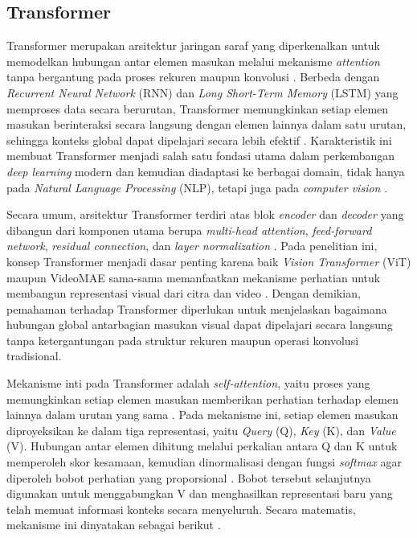 \subsection{Transformer} \label{II.Teori4}
Transformer merupakan arsitektur jaringan saraf yang diperkenalkan untuk memodelkan hubungan antar elemen masukan melalui mekanisme \textit{attention} tanpa bergantung pada proses rekuren maupun konvolusi \cite{vaswani2023attentionneed}. Berbeda dengan \textit{Recurrent Neural Network} (RNN) dan \textit{Long Short-Term Memory} (LSTM) yang memproses data secara berurutan, Transformer memungkinkan setiap elemen masukan berinteraksi secara langsung dengan elemen lainnya dalam satu urutan, sehingga konteks global dapat dipelajari secara lebih efektif \cite{vaswani2023attentionneed}. Karakteristik ini membuat Transformer menjadi salah satu fondasi utama dalam perkembangan \textit{deep learning} modern dan kemudian diadaptasi ke berbagai domain, tidak hanya pada \textit{Natural Language Processing} (NLP), tetapi juga pada \textit{computer vision} \cite{vaswani2023attentionneed}. \par

Secara umum, arsitektur Transformer terdiri atas blok \textit{encoder} dan \textit{decoder} yang dibangun dari komponen utama berupa \textit{multi-head attention}, \textit{feed-forward network}, \textit{residual connection}, dan \textit{layer normalization} \cite{vaswani2023attentionneed}. Pada penelitian ini, konsep Transformer menjadi dasar penting karena baik \textit{Vision Transformer} (ViT) maupun VideoMAE sama-sama memanfaatkan mekanisme perhatian untuk membangun representasi visual dari citra dan video \cite{dosovitskiy2021imageworth16x16words}\cite{tong2022videomaemaskedautoencodersdataefficient}\cite{vaswani2023attentionneed}. Dengan demikian, pemahaman terhadap Transformer diperlukan untuk menjelaskan bagaimana hubungan global antarbagian masukan visual dapat dipelajari secara langsung tanpa ketergantungan pada struktur rekuren maupun operasi konvolusi tradisional. \par

Mekanisme inti pada Transformer adalah \textit{self-attention}, yaitu proses yang memungkinkan setiap elemen masukan memberikan perhatian terhadap elemen lainnya dalam urutan yang sama \cite{vaswani2023attentionneed}. Pada mekanisme ini, setiap elemen masukan diproyeksikan ke dalam tiga representasi, yaitu \textit{Query} (Q), \textit{Key} (K), dan \textit{Value} (V). Hubungan antar elemen dihitung melalui perkalian antara Q dan K untuk memperoleh skor kesamaan, kemudian dinormalisasi dengan fungsi \textit{softmax} agar diperoleh bobot perhatian yang proporsional \cite{vaswani2023attentionneed}. Bobot tersebut selanjutnya digunakan untuk menggabungkan V dan menghasilkan representasi baru yang telah memuat informasi konteks secara menyeluruh. Secara matematis, mekanisme ini dinyatakan sebagai berikut \cite{vaswani2023attentionneed}.

